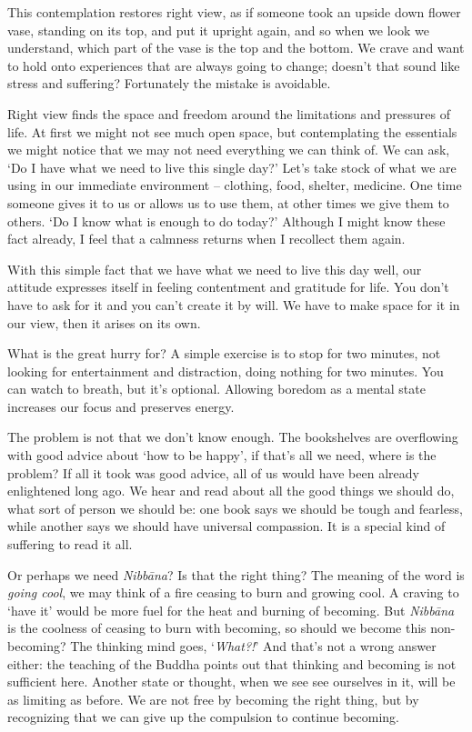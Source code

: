 \enlargethispage*{\baselineskip}

This contemplation restores right view, as if someone took an upside
down flower vase, standing on its top, and put it upright again, and so
when we look we understand, which part of the vase is the top and the
bottom. We crave and want to hold onto experiences that are always going
to change; doesn't that sound like stress and suffering? Fortunately the
mistake is avoidable.

\clearpage


Right view finds the space and freedom around the limitations and
pressures of life. At first we might not see much open space, but
contemplating the essentials we might notice that we may not need
everything we can think of. We can ask, `Do I have what we need to live
this single day?' Let's take stock of what we are using in our immediate
environment -- clothing, food, shelter, medicine. One time someone gives
it to us or allows us to use them, at other times we give them to
others. `Do I know what is enough to do today?' Although I might know
these fact already, I feel that a calmness returns when I recollect them
again.

With this simple fact that we have what we need to live this day well,
our attitude expresses itself in feeling contentment and gratitude for
life. You don't have to ask for it and you can't create it by will. We
have to make space for it in our view, then it arises on its own.

What is the great hurry for? A simple exercise is to stop for two
minutes, not looking for entertainment and distraction, doing nothing
for two minutes. You can watch to breath, but it's optional. Allowing
boredom as a mental state increases our focus and preserves energy.

The problem is not that we don't know enough. The bookshelves are
overflowing with good advice about `how to be happy', if that's all we
need, where is the problem? If all it took was good advice, all of us
would have been already enlightened long ago. We hear and read about all
the good things we should do, what sort of person we should be: one book
says we should be tough and fearless, while another says we should have
universal compassion. It is a special kind of suffering to read it all.

Or perhaps we need \emph{Nibbāna}? Is that the right thing? The meaning
of the word is \emph{going cool}, we may think of a fire ceasing to burn
and growing cool. A craving to `have it' would be more fuel for the heat
and burning of becoming. But \emph{Nibbāna} is the coolness of ceasing
to burn with becoming, so should we become this non-becoming? The
thinking mind goes, `\emph{What?!}' And that's not a wrong answer
either: the teaching of the Buddha points out that thinking and becoming
is not sufficient here. Another state or thought, when we see see
ourselves in it, will be as limiting as before. We are not free by
becoming the right thing, but by recognizing that we can give up the
compulsion to continue becoming.


